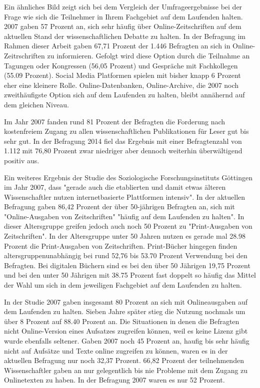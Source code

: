 Ein ähnliches Bild zeigt sich bei dem Vergleich der Umfrageergebnisse bei der Frage wie sich die Teilnehmer in Ihrem Fachgebiet auf dem Laufenden halten. 2007 gaben 57 Prozent an, sich sehr häufig über Online-Zeitschriften auf dem aktuellen Stand der wissenschaftlichen Debatte zu halten. In der Befragung im Rahmen dieser Arbeit gaben 67,71 Prozent der 1.446 Befragten an sich in Online-Zeitrschriften zu informieren. Gefolgt wird diese Option durch die Teilnahme an Tagungen oder Kongressen (56,05 Prozent) und Gespräche mit Fachkollegen (55.09 Prozent). Social Media Platformen spielen mit bisher knapp 6 Prozent eher eine kleinere Rolle. Online-Datenbanken, Online-Archive, die 2007 noch zweithäufigste Option sich auf dem Laufenden zu halten, bleibt annähernd auf dem gleichen Niveau.

Im Jahr 2007 fanden rund 81 Prozent der Befragten die Forderung nach kostenfreiem Zugang zu allen wissenschaftlichen Publikationen für Leser gut bis sehr gut. In der Befragung 2014 fiel das Ergebnis mit einer Befragtenzahl von 1.112 mit 76,80 Prozent zwar niedriger aber dennoch weiterhin überwältigend positiv aus.

Ein weiteres Ergebnis der Studie des Soziologische Forschungsinstituts Göttingen im Jahr 2007, dass "gerade auch die etablierten und damit etwas älteren Wissenschaftler nutzen internetbasierte Plattformen intensiv". In der aktuellen Befragung gaben 86,42 Prozent der über 50-jährigen Befragten an, sich mit "Online-Ausgaben von Zeitschriften" "häufig auf dem Laufenden zu halten". In dieser Altersgruppe greifen jedoch auch noch 50 Prozent zu "Print-Ausgaben von Zeitschriften". In der Altersgruppe unter 50 Jahren nutzen es gerade mal 28.98 Prozent die Print-Ausgaben von Zeitschriften. Print-Bücher hingegen finden altersgruppenunabhängig bei rund 52,76 bis 53.70 Prozent Verwendung bei den Befragten. Bei digitalen Büchern sind es bei den über 50 Jährigen 19,75 Prozent und bei den unter 50 Jährigen mit 38.75 Prozent fast doppelt so häufig das Mittel der Wahl um sich in dem jeweiligen Fachgebiet auf dem Laufenden zu halten.

In der Studie 2007 gaben insgesamt 80 Prozent an sich mit Onlineausgaben auf dem Laufenden zu halten. Sieben Jahre später stieg die Nutzung nochmals um über 8 Prozent auf 88.40 Prozent an. Die Situationen in denen die Befragten nicht Online-Version eines Aufsatzes zugreifen können, weil es keine Lizenz gibt wurde ebenfalls seltener. Gaben 2007 noch 45 Prozent an, haufig bis sehr häufig nicht auf Aufsätze und Texte online zugreifen zu können, waren es in der aktuellen Befragung nur noch 32,37 Prozent. 66,82 Prozent der teilnehmenden Wissenschaftler gaben an nur gelegentlich bis nie Probleme mit dem Zugang zu Onlinetexten zu haben. In der Befragung 2007 waren es nur 52 Prozent.

